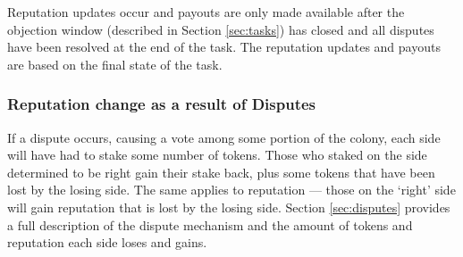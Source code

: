 Reputation updates occur and payouts are only made available after the objection window (described in Section \ref{sec:tasks}) has closed and all disputes have been resolved at the end of the task. The reputation updates and payouts are based on the final state of the task.


\subsubsection{Reputation change as a result of Disputes}\label{sec:earning-rep-in-disputes}
If a dispute occurs, causing a vote among some portion of the colony, each side will have had to stake some number of tokens. Those who staked on the side determined to be right gain their stake back, plus some tokens that have been lost by the losing side. The same applies to reputation --- those on the `right' side will gain reputation that is lost by the losing side. Section \ref{sec:disputes} provides a full description of the dispute mechanism and the amount of tokens and reputation each side loses and gains.




